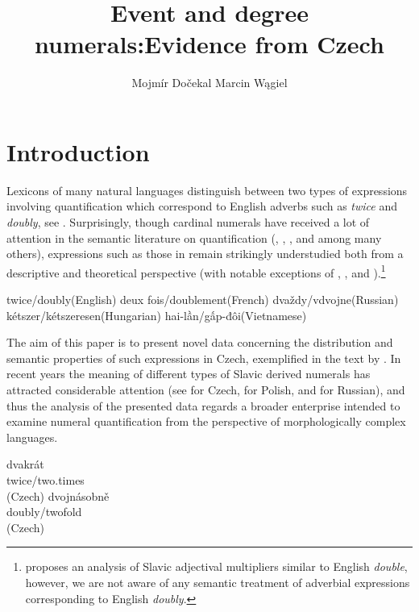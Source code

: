 \documentclass[output=paper,
modfonts,
hidelinks,
newtxmath
]{langscibook}
\title{Event and degree numerals:\newlineCover Evidence from Czech}
\author{
 Mojmír Dočekal\affiliation{Masaryk University in Brno}\lastand
 Marcin Wągiel\affiliation{Masaryk University in Brno}
}
\begin{document}
\maketitle
{}

\section{Introduction}\label{introduction}

Lexicons of many natural languages distinguish between two types of expressions involving quantification which correspond to English adverbs such as \textit{twice} and \textit{doubly}, see . Surprisingly, though cardinal numerals have received a lot of attention in the semantic literature on quantification (\citealt{landman2004indefinites}, \citealt{ionin_composition_2006}, \citealt{hofweber2005number}, and \citealt{rothstein2012numericals} among many others), expressions such as those in  remain strikingly understudied both from a descriptive and theoretical perspective (with notable exceptions of \citealt{landman_indefinite_2006}, \citealt{bhatt2007degree}, and \citealt{donazzan_ways_2013}).\footnote{\citet{wagiel-toappear-entities} proposes an analysis of Slavic adjectival multipliers similar to English \textit{double}, however, we are not aware of any semantic treatment of adverbial expressions corresponding to English \textit{doubly}.}

\ea \label{twice-double-expressions} \ea twice/doubly\hfill(English)
\ex deux fois/doublement\hfill(French)
\ex dvaždy/vdvojne\hfill(Russian)
\ex kétszer/kétszeresen\hfill(Hungarian)
\ex hai-lần/gấp-đôi\hfill(Vietnamese)
\z
\z

\noindent The aim of this paper is to present novel data concerning the distribution and semantic properties of such expressions in Czech, exemplified in the text by . In recent years the meaning of different types of Slavic derived numerals has attracted considerable attention (see \citealt{docekal2012atoms,docekal2013numerals} for Czech, \citealt{wagiel2014dwoje,wagiel2015sums} for Polish, and \citealt{khrizman2015cardinal} for Russian), and thus the analysis of the presented data regards a broader enterprise intended to examine numeral quantification from the perspective of morphologically complex languages.

\ea\label{twice-double-czech} \ea \gll dvakrát\label{dvakrat-czech}\\ 
          twice/two.times\\\hfill(Czech)
     \ex \gll dvojnásobně\label{dvojnasobne-czech}\\
          doubly/twofold\\\hfill(Czech)
          \z
\z
\end{document}
